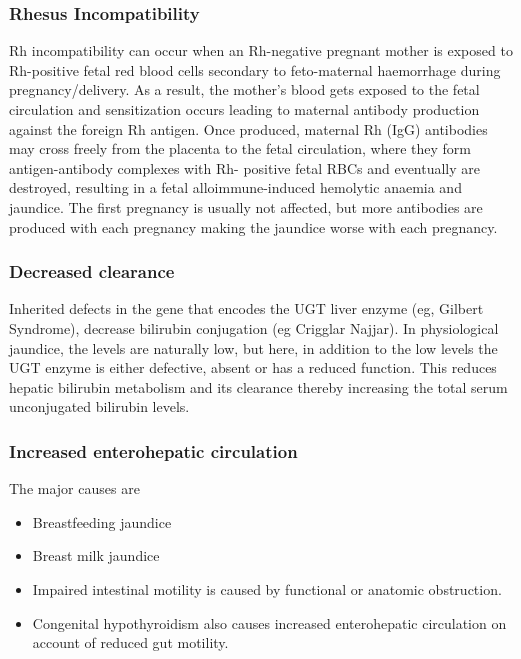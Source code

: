\documentclass[
  letterpaper,
  DIV=11,
  numbers=noendperiod]{scrreprt}
\providecommand{\tightlist}{%
  \setlength{\itemsep}{0pt}\setlength{\parskip}{0pt}}\usepackage{longtable,booktabs,array}
\begin{document}
\hypertarget{rhesus-incompatibility}{%
\subsubsection{Rhesus Incompatibility}\label{rhesus-incompatibility}}

Rh incompatibility can occur when an Rh-negative pregnant mother is
exposed to Rh-positive fetal red blood cells secondary to feto-maternal
haemorrhage during pregnancy/delivery. As a result, the mother's blood
gets exposed to the fetal circulation and sensitization occurs leading
to maternal antibody production against the foreign Rh antigen. Once
produced, maternal Rh (IgG) antibodies may cross freely from the
placenta to the fetal circulation, where they form antigen-antibody
complexes with Rh- positive fetal RBCs and eventually are destroyed,
resulting in a fetal alloimmune-induced hemolytic anaemia and jaundice.
The first pregnancy is usually not affected, but more antibodies are
produced with each pregnancy making the jaundice worse with each
pregnancy.

\hypertarget{decreased-clearance}{%
\subsubsection{Decreased clearance}\label{decreased-clearance}}

Inherited defects in the gene that encodes the UGT liver enzyme (eg,
Gilbert Syndrome), decrease bilirubin conjugation (eg Crigglar Najjar).
In physiological jaundice, the levels are naturally low, but here, in
addition to the low levels the UGT enzyme is either defective, absent or
has a reduced function. This reduces hepatic bilirubin metabolism and
its clearance thereby increasing the total serum unconjugated bilirubin
levels.

\hypertarget{increased-enterohepatic-circulation}{%
\subsubsection{Increased enterohepatic
circulation}\label{increased-enterohepatic-circulation}}

The major causes are\\

\begin{itemize}
\tightlist
\item
  Breastfeeding jaundice
\item
  Breast milk jaundice
\item
  Impaired intestinal motility is caused by functional or anatomic
  obstruction.
\item
  Congenital hypothyroidism also causes increased enterohepatic
  circulation on account of reduced gut motility.
\end{itemize}
\end{document}
